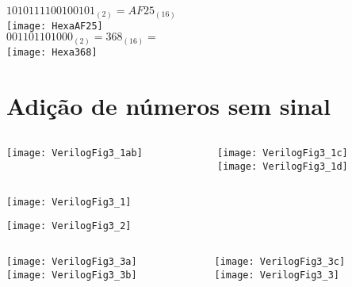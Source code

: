 \begin{frame}{\insertsection}
    \center
    $1010111100100101_{(2)}=AF25_{(16)}$ \\
    \texttt{[image: HexaAF25]} \\
    \pause
    \vspace{2cm}
    $001101101000_{(2)}=368_{(16)}=$ \\
    \texttt{[image: Hexa368]}
\end{frame}

\section{Adição de números sem sinal}

\begin{frame}{\insertsection}
    \begin{columns}
        \begin{column}{.6\textwidth}
            \texttt{[image: VerilogFig3\_1ab]}
        \end{column}
        \begin{column}{.4\textwidth}
            \texttt{[image: VerilogFig3\_1c]} \\
            \texttt{[image: VerilogFig3\_1d]}
        \end{column}
    \end{columns}
    \center \texttt{[image: VerilogFig3\_1]}
\end{frame}

\begin{frame}{\insertsection}
    \texttt{[image: VerilogFig3\_2]}
\end{frame}

\begin{frame}{\insertsection}
    \begin{columns}
        \begin{column}{.35\textwidth}
            \texttt{[image: VerilogFig3\_3a]} \\
            \texttt{[image: VerilogFig3\_3b]}
        \end{column}
        \begin{column}{.55\textwidth}
            \texttt{[image: VerilogFig3\_3c]} \\
            \texttt{[image: VerilogFig3\_3]}
        \end{column}
    \end{columns}
\end{frame}

